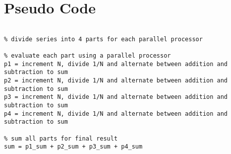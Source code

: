 \section{Pseudo Code}
\begin{lstlisting}[style=Matlab-editor]
% initialize singles

% divide series into 4 parts for each parallel processor

% evaluate each part using a parallel processor
p1 = increment N, divide 1/N and alternate between addition and subtraction to sum
p2 = increment N, divide 1/N and alternate between addition and subtraction to sum 
p3 = increment N, divide 1/N and alternate between addition and subtraction to sum 
p4 = increment N, divide 1/N and alternate between addition and subtraction to sum 

% sum all parts for final result
sum = p1_sum + p2_sum + p3_sum + p4_sum
\end{lstlisting}